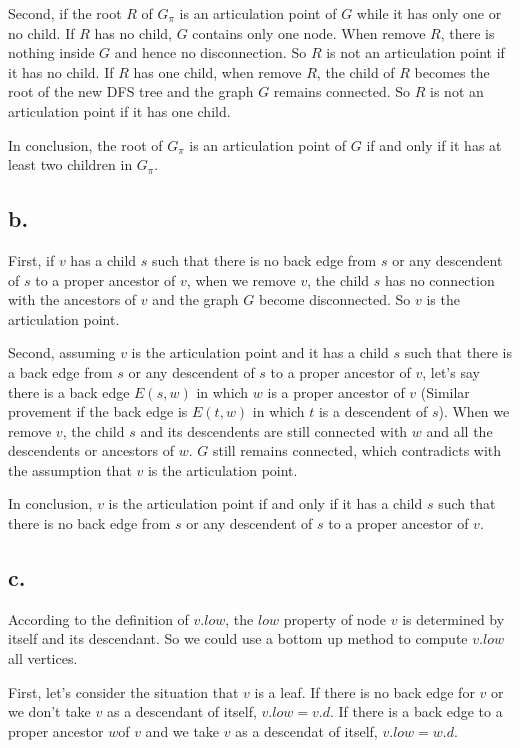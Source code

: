 \documentclass[twoside,11pt]{homework}
\begin{document}
Second, if the root $R$ of $G_{\pi}$ is an articulation point of $G$ while it has only one or no child.
If $R$ has no child, $G$ contains only one node.
When remove $R$, there is nothing inside $G$ and hence no disconnection.
So $R$ is not an articulation point if it has no child.
If $R$ has one child, when remove $R$, the child of $R$ becomes the root of the new DFS tree and the graph $G$ remains connected.
So $R$ is not an articulation point if it has one child.

In conclusion,  the root of $G_{\pi}$ is an articulation point of $G$ if and only if it has at least two children in $G_{\pi}$.

\subsection*{b.}
First, if $v$ has a child $s$ such that there is no back edge from $s$ or any descendent of $s$ to a proper ancestor of $v$, when we remove $v$, the child $s$ has no connection with the ancestors of $v$ and the graph $G$ become disconnected.
So $v$ is the articulation point.

Second, assuming $v$ is the articulation point and it has a child $s$ such that there is a back edge from $s$ or any descendent of $s$ to a proper ancestor of $v$, let's say there is a back edge $E(s, w)$ in which $w$ is a proper ancestor of $v$ (Similar provement if the back edge is $E(t, w)$ in which $t$ is a descendent of $s$).
When we remove $v$, the child $s$ and its descendents are still connected with $w$ and all the descendents or ancestors of $w$.
$G$ still remains connected, which contradicts with the assumption that $v$ is the articulation point.

In conclusion, $v$ is the articulation point if and only if it has a child $s$ such that there is no back edge from $s$ or any descendent of $s$ to a proper ancestor of $v$.

\subsection*{c.}
According to the definition of $v.low$, the $low$ property of node $v$ is determined by itself and its descendant.
So we could use a bottom up method to compute $v.low$ all vertices.

First, let's consider the situation that $v$ is a leaf.
If there is no back edge for $v$ or we don't take $v$ as a descendant of itself, $v.low = v.d$.
If there is a back edge to a proper ancestor $w$of $v$ and we take $v$ as a descendat of itself, $v.low = w.d$.
\end{document}
